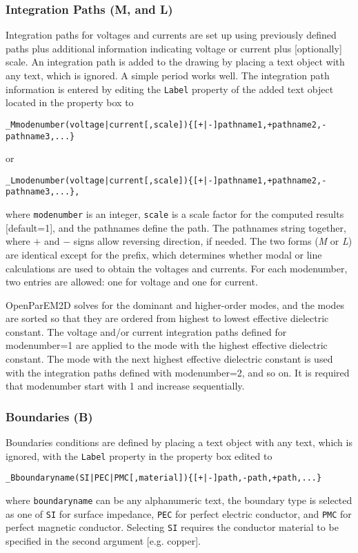 \documentclass[titlepage]{article}
\renewcommand\_{\textunderscore\linebreak[1]}
\begin{document}
\subsubsection{Integration Paths (\_M, and \_L)}
\label{sec:integration_paths}

Integration paths for voltages and currents are set up using previously defined paths plus additional information indicating voltage or current plus [optionally] scale. An integration path is added to the drawing by placing a text object with any text, which is ignored.  A simple period works well.  The integration path information is entered by editing the \texttt{Label} property of the added text object located in the property box to
\begin{Verbatim}[fontsize=\small]
  _Mmodenumber(voltage|current[,scale]){[+|-]pathname1,+pathname2,-pathname3,...}
\end{Verbatim}
\noindent or
\begin{Verbatim}[fontsize=\small]
  _Lmodenumber(voltage|current[,scale]){[+|-]pathname1,+pathname2,-pathname3,...},
\end{Verbatim}
\noindent where \texttt{modenumber} is an integer, \texttt{scale} is a scale factor for the computed results [default=1], and the pathnames define the path.  The pathnames string together, where $+$ and $-$ signs allow reversing direction, if needed.  The two forms (\textit{\_M} or \textit{\_L}) are identical except for the prefix, which determines whether modal or line calculations are used to obtain the voltages and currents.  For each modenumber, two entries are allowed: one for voltage and one for current.

OpenParEM2D solves for the dominant and higher-order modes, and the modes are sorted so that they are ordered from highest to lowest effective dielectric constant.  The voltage and/or current integration paths defined for modenumber=1 are applied to the mode with the highest effective dielectric constant. The mode with the next highest effective dielectric constant is used with the integration paths defined with modenumber=2, and so on.  It is required that modenumber start with 1 and increase sequentially.

\subsubsection{Boundaries (\_B)}

Boundaries conditions are defined by placing a text object with any text, which is ignored, with the \texttt{Label} property in the property box edited to
\begin{Verbatim}[fontsize=\small]
  _Bboundaryname(SI|PEC|PMC[,material]){[+|-]path,-path,+path,...}
\end{Verbatim}
\noindent where \texttt{boundaryname} can be any alphanumeric text, the boundary type is selected as one of \texttt{SI} for surface impedance, \texttt{PEC} for perfect electric conductor, and \texttt{PMC} for perfect magnetic conductor.  Selecting \texttt{SI} requires the conductor material to be specified in the second argument [e.g. copper].
\end{document}
